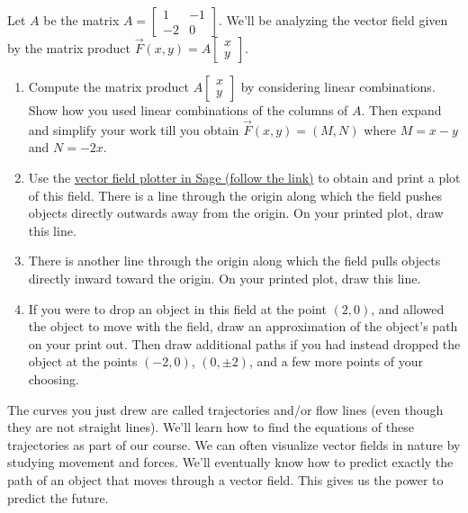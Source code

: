 \begin{problem}
Let $A$ be the matrix 
$A = 
\begin{bmatrix}
 1&-1\\-2&0
\end{bmatrix}.
$
We'll be analyzing the vector field given by the matrix product $\vec F(x,y) = A\begin{bmatrix}x\\y\end{bmatrix}$.
\begin{enumerate}
 \item Compute the matrix product $A\begin{bmatrix}x\\y\end{bmatrix}$ by considering linear combinations. Show how you used linear combinations of the columns of $A$.  Then expand and simplify your work till you obtain $\vec F(x,y) = (M,N)$ where $M=x-y$ and $N=-2x$.  
 \item 
Use the \href{\urlvectorfieldplotter}{vector field plotter in Sage (follow the link)} to obtain and print a plot of this field.  
There is a line through the origin along which the field pushes objects directly outwards away from the origin. 
On your printed plot, draw this line.
 \item 
There is another line through the origin along which the field pulls objects directly inward toward the origin. 
On your printed plot, draw this line.
 \item If you were to drop an object in this field at the point $(2,0)$, and allowed the object to move with the field, draw an approximation of the object's path on your print out.  Then draw additional paths if you had instead dropped the object at the points $(-2,0)$, $(0,\pm 2)$, and a few more points of your choosing. 

\end{enumerate}
\end{problem}

The curves you just drew are called trajectories and/or flow lines (even though they are not straight lines). We'll learn how to find the equations of these trajectories as part of our course. We can often visualize vector fields in nature by studying movement and forces.  We'll eventually know how to predict exactly the path of an object that moves through a vector field.  This gives us the power to predict the future.  





